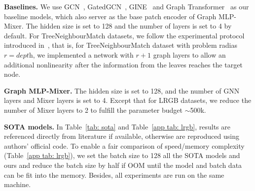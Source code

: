 \documentclass{article}
\begin{document}
\textbf{Baselines.} 
We use GCN~\citep{kipf2017semi}, GatedGCN~\citep{bresson2017gatedgcn}, GINE~\citep{hu2019gine} and Graph Transformer~\citep{dwivedi2021generalization} as our baseline models, which also server as the base patch encoder of Graph MLP-Mixer. The hidden size is set to 128 and the number of layers is set to 4 by default. For TreeNeighbourMatch datasets, we follow the experimental protocol introduced in~\citep{alon2020bottleneck}, that is, for TreeNeighbourMatch dataset with problem radias $r=\textit{depth}$, we implemented a network with $r+1$ graph layers to allow an additional nonlinearity after the information from the leaves reaches the target node. 


\textbf{Graph MLP-Mixer.}
The hidden size is set to 128, and the number of GNN layers and Mixer layers is set to 4. Except that for LRGB datasets, we reduce the number of Mixer layers to 2 to fulfill the parameter budget $\sim$500k.


\textbf{SOTA models.}
In Table~\ref{tab: sota} and Table~\ref{app tab: lrgb}, results are referenced directly from literature if available, otherwise are reproduced using authors' official code.
To enable a fair comparison of speed/memory complexity (Table~\ref{app tab: lrgb}), we set the batch size to 128 all the SOTA models and ours and reduce the batch size by half if OOM until the model and batch data can be fit into the memory. Besides, all experiments are run on the same machine.
\end{document}
